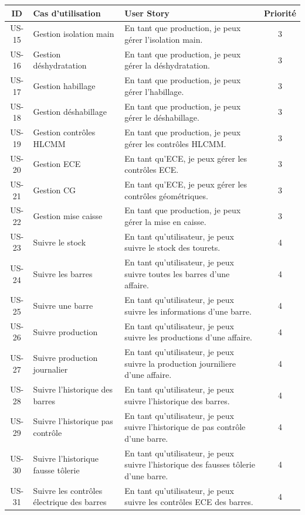 \documentclass[11pt,a4paper]{article}
\begin{document}
\begin{enumerate}
\newpage
\begin{table}[H]
\centering
\begin{tabular}{|c|p{5cm}|p{7cm}|c|}
\hline
\textbf{ID} & \textbf{Cas d’utilisation} & \textbf{User Story} & \textbf{Priorité} \\
\hline
US-15 & Gestion isolation main & En tant que production, je peux gérer l’isolation main. & 3 \\
\hline
US-16 & Gestion déshydratation & En tant que production, je peux gérer la déshydratation. & 3 \\
\hline
US-17 & Gestion habillage & En tant que production, je peux gérer l’habillage. & 3 \\
\hline
US-18 & Gestion déshabillage & En tant que production, je peux gérer le déshabillage. & 3 \\
\hline
US-19 & Gestion contrôles HLCMM & En tant que production, je peux gérer les contrôles HLCMM. & 3 \\
\hline
US-20 & Gestion ECE & En tant qu’ECE, je peux gérer les contrôles ECE. & 3 \\
\hline
US-21 & Gestion CG & En tant qu’ECE, je peux gérer les contrôles géométriques. & 3 \\
\hline
US-22 & Gestion mise caisse & En tant que production, je peux gérer la mise en caisse. & 3 \\
\hline
US-23 & Suivre le stock & En tant qu’utilisateur, je peux suivre le stock des tourets. & 4 \\
\hline
US-24 & Suivre les barres & En tant qu’utilisateur, je peux suivre toutes les barres d'une affaire. & 4 \\
\hline
US-25 & Suivre une barre  & En tant qu’utilisateur, je peux suivre les informations d'une barre. & 4 \\
\hline
US-26 & Suivre production & En tant qu’utilisateur, je peux suivre les productions d'une affaire. & 4 \\
\hline
US-27 & Suivre production journalier & En tant qu’utilisateur, je peux suivre la production journiliere d'une affaire. & 4 \\
\hline
US-28 & Suivre l'historique des barres & En tant qu’utilisateur, je peux suivre l'historique des barres. & 4 \\
\hline
US-29 & Suivre l'historique pas contrôle & En tant qu’utilisateur, je peux suivre l'historique de pas contrôle d'une barre. & 4 \\
\hline
US-30 & Suivre l'historique fausse tôlerie & En tant qu’utilisateur, je peux suivre l'historique des fausses tôlerie d'une barre. & 4 \\
\hline
US-31 & Suivre les contrôles électrique des barres & En tant qu’utilisateur, je peux suivre les contrôles ECE des barres. & 4 \\


\end{tabular}
\end{table}
\end{enumerate}
\end{document}
